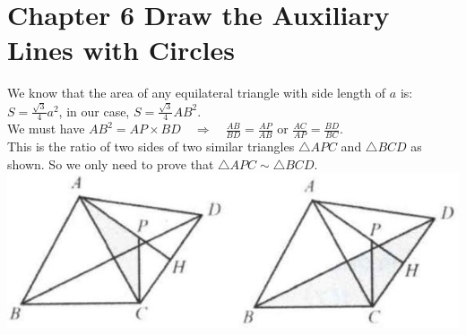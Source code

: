 \documentclass[10pt]{article}
\begin{document}
\section*{Chapter 6 Draw the Auxiliary Lines with Circles}
We know that the area of any equilateral triangle with side length of \(a\) is:\\
\(S=\frac{\sqrt{3}}{4} a^{2}\), in our case, \(S=\frac{\sqrt{3}}{4} A B^{2}\).\\
We must have \(A B^{2}=A P \times B D \quad \Rightarrow \quad \frac{A B}{B D}=\frac{A P}{A B}\) or \(\frac{A C}{A P}=\frac{B D}{B C}\).\\
This is the ratio of two sides of two similar triangles \(\triangle A P C\) and \(\triangle B C D\) as shown. So we only need to prove that \(\triangle A P C \sim \triangle B C D\).\\
\includegraphics[max width=\textwidth, center]{2025_04_17_97bc1f7e44d93c271a88g-199(1)}
\end{document}
